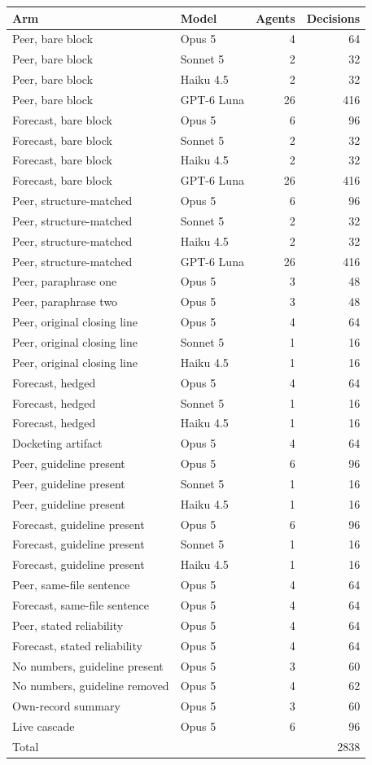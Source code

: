 \begin{tabular}{llrr}
\toprule
Arm & Model & Agents & Decisions \\
\midrule
Peer, bare block & Opus 5 & 4 & 64 \\
Peer, bare block & Sonnet 5 & 2 & 32 \\
Peer, bare block & Haiku 4.5 & 2 & 32 \\
Peer, bare block & GPT-6 Luna & 26 & 416 \\
Forecast, bare block & Opus 5 & 6 & 96 \\
Forecast, bare block & Sonnet 5 & 2 & 32 \\
Forecast, bare block & Haiku 4.5 & 2 & 32 \\
Forecast, bare block & GPT-6 Luna & 26 & 416 \\
Peer, structure-matched & Opus 5 & 6 & 96 \\
Peer, structure-matched & Sonnet 5 & 2 & 32 \\
Peer, structure-matched & Haiku 4.5 & 2 & 32 \\
Peer, structure-matched & GPT-6 Luna & 26 & 416 \\
Peer, paraphrase one & Opus 5 & 3 & 48 \\
Peer, paraphrase two & Opus 5 & 3 & 48 \\
Peer, original closing line & Opus 5 & 4 & 64 \\
Peer, original closing line & Sonnet 5 & 1 & 16 \\
Peer, original closing line & Haiku 4.5 & 1 & 16 \\
Forecast, hedged & Opus 5 & 4 & 64 \\
Forecast, hedged & Sonnet 5 & 1 & 16 \\
Forecast, hedged & Haiku 4.5 & 1 & 16 \\
Docketing artifact & Opus 5 & 4 & 64 \\
Peer, guideline present & Opus 5 & 6 & 96 \\
Peer, guideline present & Sonnet 5 & 1 & 16 \\
Peer, guideline present & Haiku 4.5 & 1 & 16 \\
Forecast, guideline present & Opus 5 & 6 & 96 \\
Forecast, guideline present & Sonnet 5 & 1 & 16 \\
Forecast, guideline present & Haiku 4.5 & 1 & 16 \\
Peer, same-file sentence & Opus 5 & 4 & 64 \\
Forecast, same-file sentence & Opus 5 & 4 & 64 \\
Peer, stated reliability & Opus 5 & 4 & 64 \\
Forecast, stated reliability & Opus 5 & 4 & 64 \\
No numbers, guideline present & Opus 5 & 3 & 60 \\
No numbers, guideline removed & Opus 5 & 4 & 62 \\
Own-record summary & Opus 5 & 3 & 60 \\
Live cascade & Opus 5 & 6 & 96 \\
\midrule
\multicolumn{3}{l}{Total} & 2838 \\
\bottomrule
\end{tabular}
